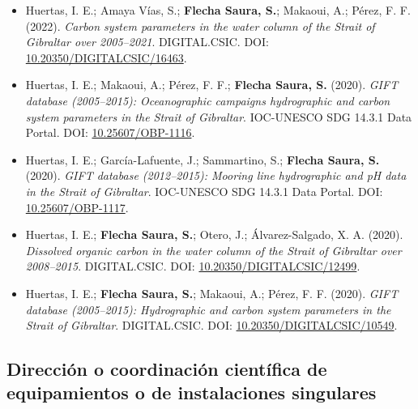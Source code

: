 \documentclass[11pt,a4paper]{article}
\begin{document}
\begin{itemize}[leftmargin=*]
    \item Huertas, I. E.; Amaya Vías, S.; \textbf{Flecha Saura, S.}; Makaoui, A.; Pérez, F. F. (2022).
    \textit{Carbon system parameters in the water column of the Strait of Gibraltar over 2005--2021}.
    DIGITAL.CSIC.
    DOI: \href{https://doi.org/10.20350/DIGITALCSIC/16463}{10.20350/DIGITALCSIC/16463}.

    \item Huertas, I. E.; Makaoui, A.; Pérez, F. F.; \textbf{Flecha Saura, S.} (2020).
    \textit{GIFT database (2005--2015): Oceanographic campaigns hydrographic and carbon system parameters in the Strait of Gibraltar}.
    IOC-UNESCO SDG 14.3.1 Data Portal.
    DOI: \href{https://doi.org/10.25607/OBP-1116}{10.25607/OBP-1116}.

    \item Huertas, I. E.; García-Lafuente, J.; Sammartino, S.; \textbf{Flecha Saura, S.} (2020).
    \textit{GIFT database (2012--2015): Mooring line hydrographic and pH data in the Strait of Gibraltar}.
    IOC-UNESCO SDG 14.3.1 Data Portal.
    DOI: \href{https://doi.org/10.25607/OBP-1117}{10.25607/OBP-1117}.

    \item Huertas, I. E.; \textbf{Flecha Saura, S.}; Otero, J.; Álvarez-Salgado, X. A. (2020).
    \textit{Dissolved organic carbon in the water column of the Strait of Gibraltar over 2008--2015}.
    DIGITAL.CSIC.
    DOI: \href{https://doi.org/10.20350/DIGITALCSIC/12499}{10.20350/DIGITALCSIC/12499}.

    \item Huertas, I. E.; \textbf{Flecha Saura, S.}; Makaoui, A.; Pérez, F. F. (2020).
    \textit{GIFT database (2005--2015): Hydrographic and carbon system parameters in the Strait of Gibraltar}.
    DIGITAL.CSIC.
    DOI: \href{https://doi.org/10.20350/DIGITALCSIC/10549}{10.20350/DIGITALCSIC/10549}.

\end{itemize}


\subsection{Dirección o coordinación científica de equipamientos o de instalaciones singulares}
\end{document}
